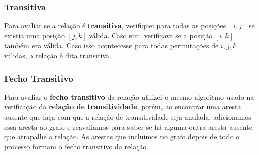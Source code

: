 \documentclass[12pt]{article}
\begin{document}
\subsubsection{Transitiva}
Para avaliar se a relação é \textbf{transitiva}, verifiquei para todas as
posições $[i,j]$ se existia uma posição $[j,k]$ válida. Caso sim, verificava se
a posição $[i,k]$ também era válida. Caso isso acontecesse para todas
permutações de $i, j, k$ válidas, a relação é dita transitiva.

\subsubsection{Fecho Transitivo}
Para avaliar o \textbf{fecho transitivo} da relação utilizei o mesmo algoritmo
usado na verificação da \textbf{relação de transitividade}, porém, ao encontrar
uma aresta ausente que faça com que a relação de transitividade seja anulada,
adicionamos essa aresta ao grafo e reavaliamos para saber se há alguma outra
aresta ausente que atrapalhe a relação. As arestas que incluímos no grafo depois
de todo o processo formam o fecho transitivo da relação.
\end{document}
